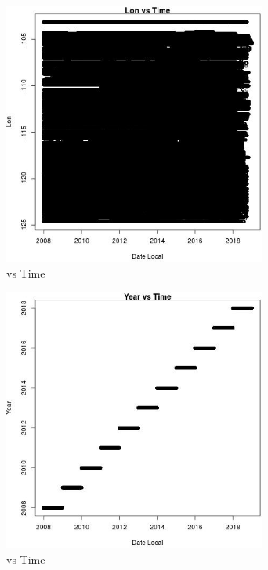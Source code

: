 \begin{figure} 
\centering  
\includegraphics[width=0.77\textwidth]{Code_Outputs/Report_PM25_Step4_part_e_de_duplicated_aves_prioritize_24hr_obs_ML_input_LonvDate_Local.jpg} 
\caption{\label{fig:Report_PM25_Step4_part_e_de_duplicated_aves_prioritize_24hr_obs_ML_inputLonvDate_Local}vs Time} 
\end{figure} 
 

\begin{figure} 
\centering  
\includegraphics[width=0.77\textwidth]{Code_Outputs/Report_PM25_Step4_part_e_de_duplicated_aves_prioritize_24hr_obs_ML_input_YearvDate_Local.jpg} 
\caption{\label{fig:Report_PM25_Step4_part_e_de_duplicated_aves_prioritize_24hr_obs_ML_inputYearvDate_Local}vs Time} 
\end{figure} 
 

